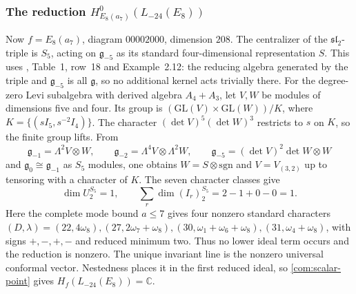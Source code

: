 \documentclass[11pt,a4paper]{amsart}
\numberwithin{equation}{section}
\theoremstyle{definition}
\theoremstyle{remark}
\newcommand{\C}{\mathbb C}
\newcommand{\g}{\mathfrak g}
\newcommand{\slg}{\mathfrak{sl}}
\begin{document}
\subsubsection{\texorpdfstring{The reduction $H^0_{E_8(a_7)}(L_{-24}(E_8))$}{The E8(a7) reduction of L-24(E8)}}
Now $f=E_8(a_7)$, diagram $00002000$, dimension $208$.
The centralizer of the $\slg_2$-triple is $S_5$, acting on $\g_{-5}$ as its
standard four-dimensional representation $S$. This uses
\cite{ElashviliJibladzeKac2022}, Table~1, row~18 and Example~2.12: the reducing
algebra generated by the triple and $\g_{-5}$ is all $\g$, so no
additional kernel acts trivially there. For the degree-zero Levi subalgebra with derived algebra $A_4+A_3$,
let $V,W$ be modules of dimensions five and four. Its group is
$(\mathrm{GL}(V)\times\mathrm{GL}(W))/K$, where
$K=\{(sI_5,s^{-2}I_4)\}$. The character $(\det V)^5(\det W)^3$
restricts to $s$ on $K$, so the finite group lifts. From
$$
 \g_{-1}=\Lambda^2V\otimes W,\qquad
 \g_{-2}=\Lambda^4V\otimes\Lambda^2W,\qquad
 \g_{-5}=(\det V)^2\det W\otimes W
$$
and $\g_0\cong\g_{-1}$ as $S_5$ modules, one obtains
$W=S\otimes\mathrm{sgn}$ and $V=V_{(3,2)}$ up to tensoring with a character of $K$.
The seven character classes give
$$
 \dim U_2^{S_5}=1,\qquad
 \sum_r\dim(I_r)_2^{S_5}=2-1+0-0=1.
$$
Here the complete mode bound $a\le7$ gives four nonzero standard characters
$(D,\lambda)=(22,4\omega_8),(27,2\omega_7+\omega_8),
(30,\omega_1+\omega_6+\omega_8),(31,\omega_4+\omega_8)$,
with signs $+,-,+,-$ and reduced minimum two. Thus no lower ideal term
occurs and the reduction is nonzero. The unique invariant line is the nonzero
universal conformal vector. Nestedness places it in the first reduced ideal,
so \cref{com:scalar-point} gives $H_f(L_{-24}(E_8))=\C$.
\end{document}
